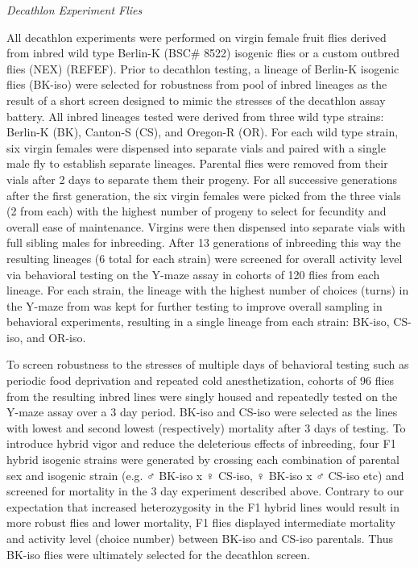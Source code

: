 \documentclass[12pt,letterpaper]{article}
\begin{document}
\textit{Decathlon Experiment Flies}

All decathlon experiments were performed on virgin female fruit flies derived from inbred wild type Berlin-K (BSC# 8522) isogenic flies or a custom outbred flies (NEX) (REFEF). Prior to decathlon testing, a lineage of Berlin-K isogenic flies (BK-iso) were selected for robustness from pool of inbred lineages as the result of a short screen designed to mimic the stresses of the decathlon assay battery.  All inbred lineages tested were derived from three wild type strains:  Berlin-K (BK), Canton-S (CS), and Oregon-R (OR). For each wild type strain, six virgin females were dispensed into separate vials and paired with a single male fly to establish separate lineages. Parental flies were removed from their vials after 2 days to separate them their progeny. For all successive generations after the first generation, the six virgin females were picked from the three vials (2 from each) with the highest number of progeny to select for fecundity and overall ease of maintenance. Virgins were then dispensed into separate vials with full sibling males for inbreeding. After 13 generations of inbreeding this way the resulting lineages (6 total for each strain) were screened for overall activity level via behavioral testing on the Y-maze assay in cohorts of 120 flies from each lineage. For each strain, the lineage with the highest number of choices (turns) in the Y-maze from was kept for further testing to improve overall sampling in behavioral experiments, resulting in a single lineage from each strain: BK-iso, CS-iso, and OR-iso. 

To screen robustness to the stresses of multiple days of behavioral testing such as periodic food deprivation and repeated cold anesthetization, cohorts of 96 flies from the resulting inbred lines were singly housed and repeatedly tested on the Y-maze assay over a 3 day period. BK-iso and CS-iso were selected as the lines with lowest and second lowest (respectively) mortality after 3 days of testing. To introduce hybrid vigor and reduce the deleterious effects of inbreeding, four F1 hybrid isogenic strains were generated by crossing each combination of parental sex and isogenic strain (e.g. ♂ BK-iso x  ♀ CS-iso, ♀ BK-iso x  ♂ CS-iso etc) and screened for mortality in the 3 day experiment described above. Contrary to our expectation that increased heterozygosity in the F1 hybrid lines would result in more robust flies and lower mortality, F1 flies displayed intermediate mortality and activity level (choice number) between BK-iso and CS-iso parentals. Thus BK-iso flies were ultimately selected for the decathlon screen.
\end{document}

